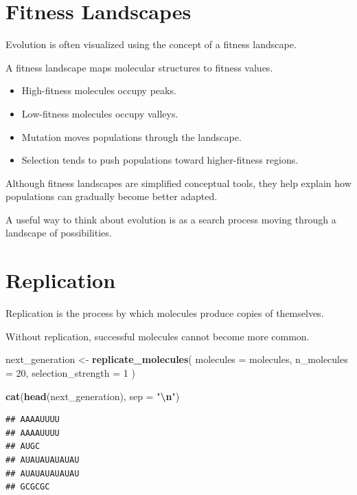 \documentclass[
  oneside,
  openany]{book}
\newenvironment{Shaded}{\begin{snugshade}}{\end{snugshade}}
\newcommand{\AttributeTok}[1]{\textcolor[rgb]{0.13,0.29,0.53}{#1}}
\newcommand{\DecValTok}[1]{\textcolor[rgb]{0.00,0.00,0.81}{#1}}
\newcommand{\FunctionTok}[1]{\textcolor[rgb]{0.13,0.29,0.53}{\textbf{#1}}}
\newcommand{\NormalTok}[1]{#1}
\newcommand{\OtherTok}[1]{\textcolor[rgb]{0.56,0.35,0.01}{#1}}
\newcommand{\SpecialCharTok}[1]{\textcolor[rgb]{0.81,0.36,0.00}{\textbf{#1}}}
\newcommand{\StringTok}[1]{\textcolor[rgb]{0.31,0.60,0.02}{#1}}
\providecommand{\tightlist}{%
  \setlength{\itemsep}{0pt}\setlength{\parskip}{0pt}}
\begin{document}
\section{Fitness Landscapes}\label{fitness-landscapes}

Evolution is often visualized using the concept of a fitness landscape.

A fitness landscape maps molecular structures to fitness values.

\begin{itemize}
\tightlist
\item
  High-fitness molecules occupy peaks.
\item
  Low-fitness molecules occupy valleys.
\item
  Mutation moves populations through the landscape.
\item
  Selection tends to push populations toward higher-fitness regions.
\end{itemize}

Although fitness landscapes are simplified conceptual tools, they help explain how populations can gradually become better adapted.

A useful way to think about evolution is as a search process moving through a landscape of possibilities.

\section{Replication}\label{replication}

Replication is the process by which molecules produce copies of themselves.

Without replication, successful molecules cannot become more common.

\begin{Shaded}
\begin{Highlighting}[]
\NormalTok{next\_generation }\OtherTok{\textless{}{-}} \FunctionTok{replicate\_molecules}\NormalTok{(}
  \AttributeTok{molecules =}\NormalTok{ molecules,}
  \AttributeTok{n\_molecules =} \DecValTok{20}\NormalTok{,}
  \AttributeTok{selection\_strength =} \DecValTok{1}
\NormalTok{)}

\FunctionTok{cat}\NormalTok{(}\FunctionTok{head}\NormalTok{(next\_generation), }\AttributeTok{sep =} \StringTok{"}\SpecialCharTok{\textbackslash{}n}\StringTok{"}\NormalTok{)}
\end{Highlighting}
\end{Shaded}

\begin{verbatim}
## AAAAUUUU
## AAAAUUUU
## AUGC
## AUAUAUAUAUAU
## AUAUAUAUAUAU
## GCGCGC
\end{verbatim}
\end{document}
